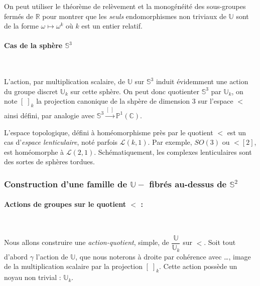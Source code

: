 \begin{rema}
On peut utiliser le th\'eor\`eme de rel\`evement et la monog\'en\'eit\'e des sous-groupes ferm\'es de $\mathbb{R}$ pour montrer que les \emph{seuls} %
endomorphismes non triviaux de $\mathbb{U}$ sont de la forme $\omega\mapsto\omega^k$ o\`u $k$ est un entier relatif.
\end{rema}

\paragraph{Cas de la sph\`ere $\mathbb{S}^3$}~\\

\par
L'action, par multiplication scalaire, de $\mathbb{U}$ sur $\mathbb{S}^3$ induit \'evidemment une action du groupe discret $\mathbb{U}_k$ sur cette sph\`ere. %
On peut donc quotienter $\mathbb{S}^3$ par $\mathbb{U}_k$, on note $[\; ]_k$ la projection canonique de la shp\`ere de dimension $3$ sur l'espace $\lt$ ainsi d\'efini, %
par analogie avec $\mathbb{S}^3\xrightarrow{[\; ]}\mathbb{P}^1(\mathbb{C})$.
\par
L'espace topologique, d\'efini \`a hom\'eomorphisme pr\`es par le quotient $\lt$ est un cas d'\emph{espace lenticulaire}, not\'e parfois $\mathcal{L}(k,1)$. %
Par exemple, $SO(3)$ ou $\lt[2]$, est hom\'eomorphe \`a $\mathcal{L}(2,1)$. Sch\'ematiquement, les complexes lenticulaires sont des sortes de \og{}sph\`eres tordues\fg{}.

\subsubsection{Construction d'une famille de $\mathbb{U}-$ fibr\'es au-dessus de $\mathbb{S}^2$}\label{lt1}

\paragraph{Actions de groupes sur le quotient $\lt$ :}~\\

\par
Nous allons construire une \emph{action-quotient}, simple, de $\dfrac{\mathbb{U}}{\mathbb{U}_k}$ sur $\lt$. Soit tout d'abord $\gamma$ l'action de $\mathbb{U}$, %
que nous noterons \`a droite par coh\'erence avec \dots , image de la multiplication scalaire par la projection $[\; ]_k$. %
Cette action poss\`ede un noyau non trivial : $\mathbb{U}_k$.

